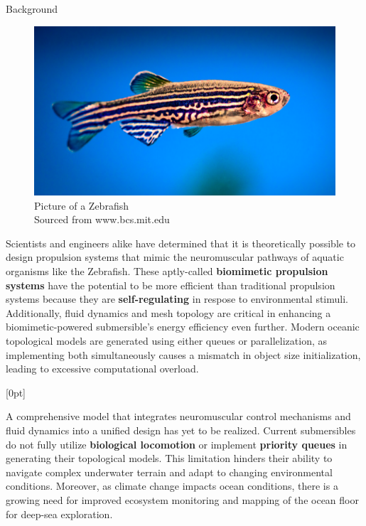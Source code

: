 \documentclass[final, 16pt]{beamer}
\newlength{\colwidth}
\begin{document}
\begin{frame}[t]
\begin{columns}[t]
\begin{column}{\colwidth}
\begin{block}{Background}
\begin{multicols}{2}
      \begin{figure}[H]
        \centering
        \includegraphics[width=0.95\linewidth]{img/Zebrafish.png}
        \caption{Picture of a Zebrafish \\ Sourced from www.bcs.mit.edu}
        \label{fig:zebrafish}
      \end{figure}
    \end{multicols}

    Scientists and engineers alike have determined that it is theoretically possible to design propulsion systems that mimic the neuromuscular pathways of aquatic organisms like the Zebrafish. These aptly-called \textbf{biomimetic propulsion systems} have the potential to be more efficient than traditional propulsion systems because they are \textbf{self-regulating} in respose to environmental stimuli. Additionally, fluid dynamics and mesh topology are critical in enhancing a biomimetic-powered submersible's energy efficiency even further. Modern oceanic topological models are generated using either queues or parallelization, as implementing both simultaneously causes a mismatch in object size initialization, leading to excessive computational overload.

    [0pt]

    A comprehensive model that integrates neuromuscular control mechanisms and fluid dynamics into a unified design has yet to be realized. Current submersibles do not fully utilize \textbf{biological locomotion} or implement \textbf{priority queues} in generating their topological models. This limitation hinders their ability to navigate complex underwater terrain and adapt to changing environmental conditions. Moreover, as climate change impacts ocean conditions, there is a growing need for improved ecosystem monitoring and mapping of the ocean floor for deep-sea exploration.


\end{block}
\end{column}
\end{columns}
\end{frame}
\end{document}
